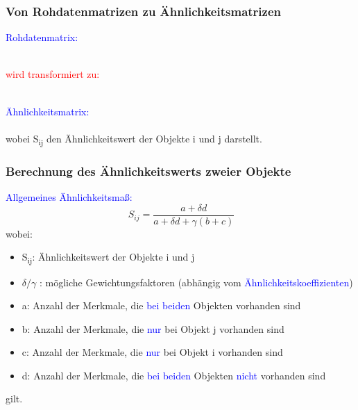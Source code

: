 \documentclass{beamer}
\begin{document}
\begin{frame}
 \frametitle{Von Rohdatenmatrizen zu Ähnlichkeitsmatrizen}
 \textcolor{blue}{Rohdatenmatrix:}
  \\
 \ \\
 \centerline{\textcolor{red}{wird transformiert zu:}}
 \ \\
 \textcolor{blue}{Ähnlichkeitsmatrix:}
  \\
 \ \\
 wobei S\textsubscript{ij} den Ähnlichkeitswert der Objekte i und j darstellt.
 

\end{frame}

\begin{frame}
 \frametitle{Berechnung des Ähnlichkeitswerts zweier Objekte}
 \textcolor{blue}{Allgemeines Ähnlichkeitsmaß:}
 \begin{equation}
  \ S_{ij}=\frac{a+\delta d}{a+\delta d+\gamma (b+c)}
 \end{equation}
 wobei: \\
 \begin{itemize}
  \item S\textsubscript{ij}: Ähnlichkeitswert der Objekte i und j
  \item $\delta /\gamma$ : mögliche Gewichtungsfaktoren (abhängig vom \textcolor{blue}{Ähnlichkeitskoeffizienten})
  \item a: Anzahl der Merkmale, die \textcolor{blue}{bei beiden} Objekten vorhanden sind
  \item b: Anzahl der Merkmale, die \textcolor{blue}{nur} bei Objekt j vorhanden sind
  \item c: Anzahl der Merkmale, die \textcolor{blue}{nur} bei Objekt i vorhanden sind
  \item d: Anzahl der Merkmale, die \textcolor{blue}{bei beiden} Objekten \textcolor{blue}{nicht} vorhanden sind
 \end{itemize}
 gilt.
\end{frame}
\end{document}

